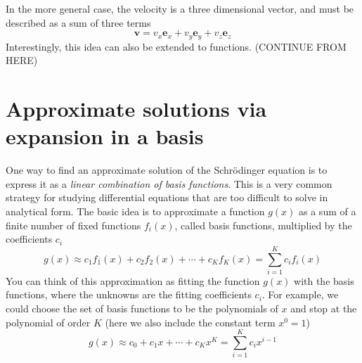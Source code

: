\documentclass[../Main/chem371-notes.tex]{subfiles}
\begin{document}
In the more general case, the velocity is a three dimensional vector, and must be described as a sum of three terms
\begin{equation}
\mathbf{v} = v_x \mathbf{e}_x + v_y \mathbf{e}_y + v_z \mathbf{e}_z
\end{equation}
Interestingly, this idea can also be extended to functions. 
(CONTINUE FROM HERE)


\section{Approximate solutions via expansion in a basis}
One way to find an approximate solution of the Schr\"{o}dinger equation is to express it as a \emph{linear combination of basis functions}.
This is a very common strategy for studying differential equations that are too difficult to solve in analytical form.
The basic idea is to approximate a function $g(x)$ as a sum of a finite number of fixed functions $f_i(x)$, called basis functions, multiplied by the coefficients $c_i$
\begin{equation}
g(x) \approx  c_1 f_1(x) +  c_2 f_2(x) + \cdots + c_K f_K(x) = \sum_{i=1}^{K} c_i f_i(x) 
\end{equation}
You can think of this approximation as fitting the function $g(x)$ with the basis functions, where the unknowns are the fitting coefficients $c_i$.
For example, we could choose the set of basis functions to be the polynomials of $x$ and stop at the polynomial of order $K$ (here we also include the constant term $x^0 = 1$)
\begin{equation}
g(x) \approx  c_0 +  c_1 x + \cdots + c_K x^{K} = \sum_{i=1}^{K} c_i x^{i-1}
\end{equation}
\end{document}
